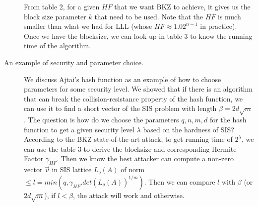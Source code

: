 \begin{description}
            From table 2, for a given $HF$ that we want BKZ to achieve, it gives
            us the block size parameter $k$ that need to be used. Note that the
            $HF$ is much smaller than what we had for LLL (whose $HF \approx
            1.02^{n-1}$ in practice). Once we have the blocksize, we can look up in
            table 3 to know the running time of the algorithm.

        \item [An example of security and parameter choice.] We discuss Ajtai's
            hash function as an example of how to choose parameters for some
            security level. We showed that if there is an algorithm that can
            break the collision-resistance property of the hash function, we
            can use it to find a short vector of the SIS problem with length
            $\beta = 2d\sqrt{m}$. The question is how do we choose the
            parameters $q,n,m,d$ for the hash function to get a given security
            level $\lambda$ based on the hardness of SIS? According to the BKZ
            state-of-the-art attack, to get running time of $2^\lambda$, we can
            use the table 3 to derive the blocksize and corresponding Hermite
            Factor $\gamma_{HF}$.
            Then we know the best attacker can compute a non-zero vector
            $\vec{v}$ in SIS lattice $L_q(A)$ of norm $\leq l = min(q,
            \gamma_{HF}.det(L_q(A))^{1/m})$. Then we can compare $l$ with
            $\beta$ (or $2d\sqrt{m}$), if $l < \beta$, the attack will work and
            otherwise.


\end{description}
